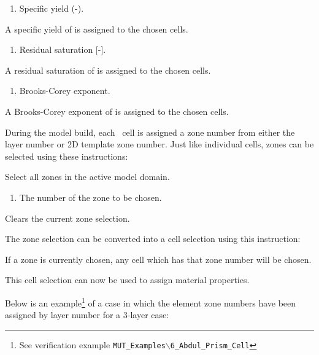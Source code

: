 {
    {
        \squish
        \begin{enumerate}
        \item {}  Specific yield (-).
        \end{enumerate}
          A specific yield of  is assigned to the chosen cells.
    }

    {
        \squish
        \begin{enumerate}
        \item {}  Residual saturation [-].
        \end{enumerate}
          A residual saturation of  is assigned to the chosen cells.
    }

    {
        \squish
        \begin{enumerate}
        \item {}  Brooks-Corey exponent.
        \end{enumerate}
          A Brooks-Corey exponent of  is assigned to the chosen cells.
    }

During the model build, each \gwf\ cell is assigned a zone number from either the layer number or 2D template zone number. Just like individual cells, zones can be selected using these instructions\label{page:zoneSelect}:

    {Select all zones in the active model domain.
     }

    {
        \squish
        \begin{enumerate}
        \item {}  The number of the zone to be chosen.
        \end{enumerate}
        \squish
    }

    {Clears the current zone selection.
     }

The zone selection can be converted into a cell selection using this instruction:

    {If a zone is currently chosen, any cell which has that zone number will be chosen.
     }

This cell selection can now be used to assign material properties.

Below is an example\footnote{See verification example \texttt{MUT\_Examples$\backslash$6\_Abdul\_Prism\_Cell}} of a case in which the element zone numbers have been assigned by layer number for a 3-layer case:

}
